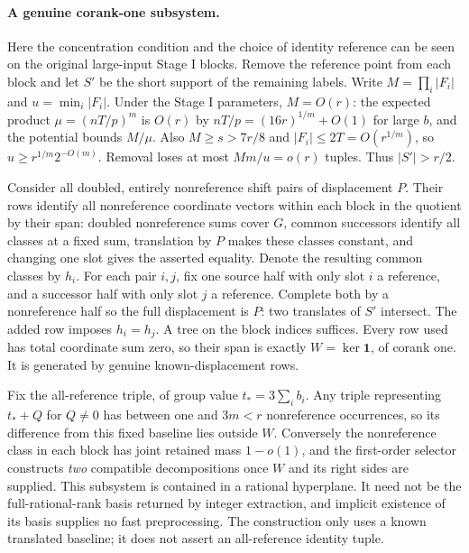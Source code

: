\documentclass[11pt]{article}
\begin{document}
\paragraph{A genuine corank-one subsystem.}
Here the concentration condition and the choice of identity reference can be seen on the original large-input Stage I blocks. Remove the reference point from each block and let $S'$ be the short support of the remaining labels. Write $M=\prod_i|F_i|$ and $u=\min_i|F_i|$. Under the Stage I parameters, $M=O(r)$: the expected product $\mu=(nT/p)^m$ is $O(r)$ by $nT/p=(16r)^{1/m}+O(1)$ for large $b$, and the potential bounds $M/\mu$. Also $M\ge s>7r/8$ and $|F_i|\le 2T=O(r^{1/m})$, so $u\ge r^{1/m}2^{-O(m)}$. Removal loses at most $Mm/u=o(r)$ tuples. Thus $|S'|>r/2$.

Consider all doubled, entirely nonreference shift pairs of displacement $P$. Their rows identify all nonreference coordinate vectors within each block in the quotient by their span: doubled nonreference sums cover $G$, common successors identify all classes at a fixed sum, translation by $P$ makes these classes constant, and changing one slot gives the asserted equality. Denote the resulting common classes by $h_i$. For each pair $i,j$, fix one source half with only slot $i$ a reference, and a successor half with only slot $j$ a reference. Complete both by a nonreference half so the full displacement is $P$: two translates of $S'$ intersect. The added row imposes $h_i=h_j$. A tree on the block indices suffices. Every row used has total coordinate sum zero, so their span is exactly $W=\ker\mathbf1$, of corank one. It is generated by genuine known-displacement rows.

Fix the all-reference triple, of group value $t_*=3\sum_i b_i$. Any triple representing $t_*+Q$ for $Q\ne0$ has between one and $3m<r$ nonreference occurrences, so its difference from this fixed baseline lies outside $W$. Conversely the nonreference class in each block has joint retained mass $1-o(1)$, and the first-order selector constructs \emph{two} compatible decompositions once $W$ and its right sides are supplied. This subsystem is contained in a rational hyperplane. It need not be the full-rational-rank basis returned by integer extraction, and implicit existence of its basis supplies no fast preprocessing. The construction only uses a known translated baseline; it does not assert an all-reference identity tuple.
\end{document}
